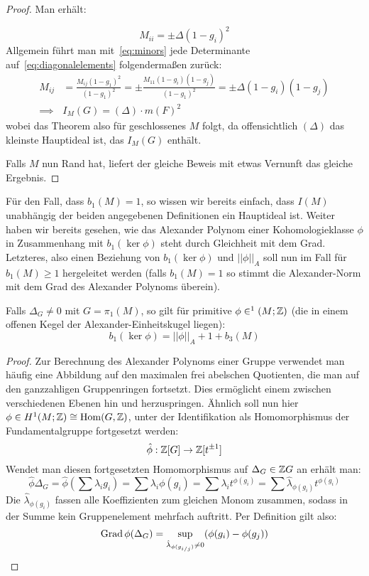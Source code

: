 \begin{proof}
	Man erhält:
	
	\begin{equation}
		M_{ii}= \pm \Delta (1-g_i)^2 \label{eq:diagonalelements}
	\end{equation}
	Allgemein führt man mit~\eqref{eq:minors} jede Determinante auf~\eqref{eq:diagonalelements} folgendermaßen zurück:
	\begin{align}
		M_{ij} &= \frac{M_{ij}(1-g_1)^2}{(1-g_1)^2} 
				= \pm \frac{M_{11}(1-g_i)(1-g_j)}{(1-g_1)^2}
				= \pm \Delta (1-g_i)(1-g_j)\\
		\implies &I_M(G) = (\Delta) \cdot m(F)^2 
	\end{align}
	wobei das Theorem also für geschlossenes $M$ folgt, da offensichtlich $(\Delta)$ das kleinste Hauptideal ist, das $I_M(G)$ enthält.

	Falls $M$ nun Rand hat, liefert der gleiche Beweis mit etwas Vernunft das gleiche Ergebnis. 
\end{proof} 

Für den Fall, dass $b_1(M)=1$, so wissen wir bereits einfach, dass $I(M)$ unabhängig der beiden angegebenen Definitionen ein Hauptideal ist. Weiter haben wir bereits gesehen, wie das Alexander Polynom einer Kohomologieklasse $\phi$ in Zusammenhang mit $b_1(\ker \phi)$ steht durch Gleichheit mit dem Grad. Letzteres, also einen Beziehung von $b_1(\ker\phi)$ und $||\phi||_A$ soll nun im Fall für $b_1(M)\geq 1$ hergeleitet werden (falls $b_1(M)=1$ so stimmt die Alexander-Norm mit dem Grad des Alexander Polynoms überein).

\begin{thm}
	Falls $\Delta_G \neq 0$ mit $G=\pi_1(M)$, so gilt für primitive $\phi \in ^1(M;\mathbb{Z})$ (die in einem offenen Kegel der Alexander-Einheitskugel liegen):
	\[
		b_1(\ker\phi) = ||\phi||_A + 1 + b_3(M)
	\]
\end{thm}
\begin{proof}
	Zur Berechnung des Alexander Polynoms einer Gruppe verwendet man häufig eine Abbildung auf den maximalen frei abelschen Quotienten, die man auf den ganzzahligen Gruppenringen fortsetzt. Dies ermöglicht einem zwischen verschiedenen Ebenen hin und herzuspringen. Ähnlich soll nun hier $\phi \in H^1(M;\mathbb{Z}) \cong \operatorname{Hom}(G,\mathbb{Z}) $, unter der Identifikation als Homomorphismus der Fundamentalgruppe fortgesetzt werden:
	\[
		\hat \phi:\mathbb{Z}[G] \to \mathbb{Z}[t^{\pm 1}]
	\]
	Wendet man diesen fortgesetzten Homomorphismus auf $\Delta_G\in \mathbb{Z} G$ an erhält man: \[
		\hat \phi \Delta_G = \hat \phi (\sum \lambda_i g_i)= \sum \lambda_i \phi(g_i) = \sum \lambda_i t^{\phi(g_i)} = \sum \hat \lambda_{\phi(g_i)} t^{\phi(g_i)}
	\]
	Die $\hat \lambda_{\phi(g_i)}$ fassen alle Koeffizienten zum gleichen Monom zusammen, sodass in der Summe kein Gruppenelement mehrfach auftritt. Per Definition gilt also:
	\[
		\operatorname{Grad} \phi(\Delta_G) = \sup_{\hat \lambda_{\phi(g_{i/j})} \neq 0} (\phi(g_i)- \phi(g_j))
	\]
\end{proof}

